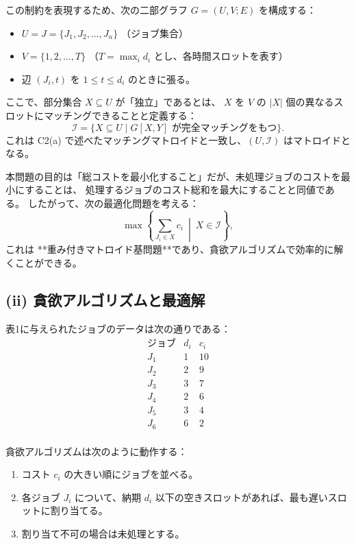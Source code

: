 \documentclass[a4paper]{ltjsarticle}
\begin{document}
この制約を表現するため、次の二部グラフ $G = (U, V; E)$ を構成する：
\begin{itemize}
  \item $U = J = \{J_1, J_2, \dots, J_n\}$ （ジョブ集合）
  \item $V = \{1, 2, \dots, T\}$ （$T = \max_i d_i$ とし、各時間スロットを表す）
  \item 辺 $(J_i, t)$ を $1 \le t \le d_i$ のときに張る。
\end{itemize}

ここで、部分集合 $X \subseteq U$ が「独立」であるとは、
$X$ を $V$ の $|X|$ 個の異なるスロットにマッチングできることと定義する：
\[
  \mathcal{I} = \{ X \subseteq U \mid G[X, Y] \text{ が完全マッチングをもつ} \}.
\]
これは C2(a) で述べたマッチングマトロイドと一致し、$(U, \mathcal{I})$ はマトロイドとなる。

本問題の目的は「総コストを最小化すること」だが、未処理ジョブのコストを最小にすることは、
処理するジョブのコスト総和を最大にすることと同値である。
したがって、次の最適化問題を考える：
\[
  \max \left\{ \sum_{J_i \in X} c_i \ \middle| \ X \in \mathcal{I} \right\},
\]
これは **重み付きマトロイド基問題**であり、貪欲アルゴリズムで効率的に解くことができる。

\subsection*{(ii) 貪欲アルゴリズムと最適解}

表1に与えられたジョブのデータは次の通りである：
\[
\begin{array}{c|c|c}
\text{ジョブ} & d_i & c_i \\ \hline
J_1 & 1 & 10 \\
J_2 & 2 & 9 \\
J_3 & 3 & 7 \\
J_4 & 2 & 6 \\
J_5 & 3 & 4 \\
J_6 & 6 & 2 \\
\end{array}
\]

貪欲アルゴリズムは次のように動作する：
\begin{enumerate}
  \item コスト $c_i$ の大きい順にジョブを並べる。
  \item 各ジョブ $J_i$ について、納期 $d_i$ 以下の空きスロットがあれば、最も遅いスロットに割り当てる。
  \item 割り当て不可の場合は未処理とする。
\end{enumerate}
\end{document}

